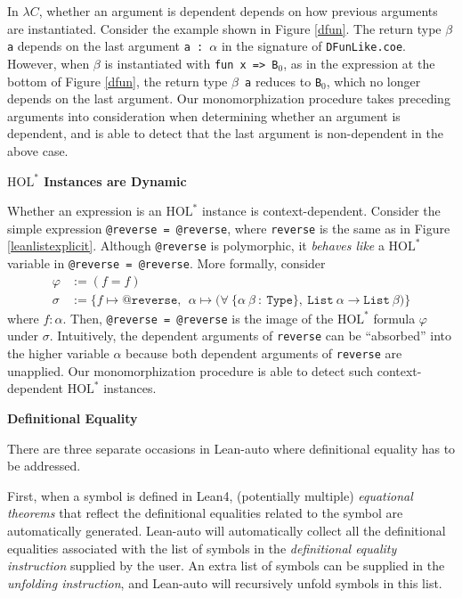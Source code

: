   In $\lambda C$, whether an argument is dependent depends on how previous arguments
are instantiated. Consider the example shown in Figure \ref{dfun}. The return
type \texttt{$\beta$ a} depends on the last argument \texttt{a : $\alpha$} in the signature of
\texttt{DFunLike.coe}. However, when $\beta$ is instantiated with \texttt{fun x => B$_0$}, as in the
expression at the bottom of Figure \ref{dfun}, the return type \texttt{$\beta$ a} reduces to \texttt{B$_0$},
which no longer depends on the last argument. Our monomorphization procedure takes preceding arguments into
consideration when determining whether an argument is dependent, and is able to detect
that the last argument is non-dependent in the above case.

\noindent \textbf{$\text{HOL}^*$ Instances are Dynamic}

  Whether an expression is an $\text{HOL}^*$ instance is context-dependent.
Consider the simple expression \texttt{@reverse = @reverse}, where \texttt{reverse}
is the same as in Figure \ref{leanlistexplicit}. Although \texttt{@reverse} is polymorphic,
it \textit{behaves like} a $\text{HOL}^*$ variable in \texttt{@reverse = @reverse}. More formally,
consider
$$\begin{aligned}
\varphi &:= (f = f) \\
\sigma  &:= \{f \mapsto \texttt{@reverse}, \ \ \alpha \mapsto \texttt{(} \forall \ \texttt{\{}\alpha \ \beta \ : \ \texttt{Type\}}, \ 
  \texttt{List} \ \alpha \to \texttt{List} \ \beta \texttt{)}\}
\end{aligned}$$
where $f : \alpha$. Then, \texttt{@reverse = @reverse} is the image of the $\text{HOL}^*$ formula $\varphi$
under $\sigma$. Intuitively, the dependent arguments of \texttt{reverse} can be ``absorbed''
into the higher variable $\alpha$ because both dependent arguments of \texttt{reverse} are unapplied.
Our monomorphization procedure is able to detect such context-dependent $\text{HOL}^*$ instances.

\noindent \textbf{Definitional Equality}

  There are three separate occasions in Lean-auto where definitional
equality has to be addressed.

  First, when a symbol is defined in Lean4, (potentially multiple) \textit{equational theorems} that
reflect the definitional equalities related to the symbol are automatically generated.
Lean-auto will automatically collect all the definitional equalities associated with the
list of symbols in the \textit{definitional equality instruction} supplied by the user. An
extra list of symbols can be supplied in the \textit{unfolding instruction}, and Lean-auto will
recursively unfold symbols in this list.

